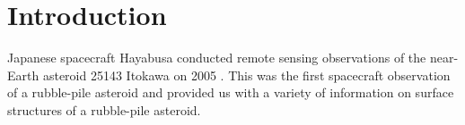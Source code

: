 \documentclass[3p,authoryear]{elsarticle}
\begin{document}
\linenumbers

\section{Introduction}\label{sec:intro}

Japanese spacecraft Hayabusa conducted remote sensing observations of the near-Earth asteroid 25143 Itokawa on 2005 \citep{fujiwara2006, saito2006}. 
This was the first spacecraft observation of a rubble-pile asteroid and provided us with a variety of information on surface structures of a rubble-pile asteroid.
\end{document}
